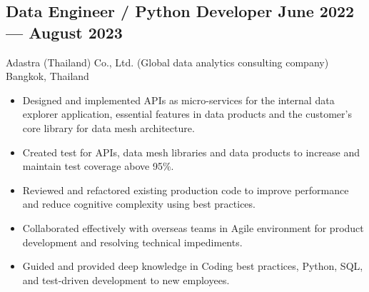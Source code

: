 \documentclass{article}
\newcommand{\subtext}[1]{
#1\par\vspace{-0.2cm}}
\newenvironment{zitemize}{
\begin{itemize}\itemsep0pt \parskip0pt \parsep1pt}
{\end{itemize}\vspace{-0.5cm}}
\begin{document}
        \vspace{0.2cm}

        \subsection*{Data Engineer / Python Developer \hfill June 2022 --- August 2023}
        \subtext{Adastra (Thailand) Co., Ltd. {\scriptsize (Global data analytics consulting company)} \hfill Bangkok, Thailand}
            \vspace{0.05cm}
            \begin{zitemize}
                \item Designed and implemented APIs as micro-services for the internal data explorer application, essential features in data products and the customer's core library for data mesh architecture.
                \item Created test for APIs, data mesh libraries and data products to increase and maintain test coverage above 95\%.
                \item Reviewed and refactored existing production code to improve performance and reduce cognitive complexity using best practices.
                \item Collaborated effectively with overseas teams in Agile environment for product development and resolving technical impediments.
                \item Guided and provided deep knowledge in Coding best practices, Python, SQL, and test-driven development to new employees.
            \end{zitemize}

        \vspace{0.2cm}
\end{document}
